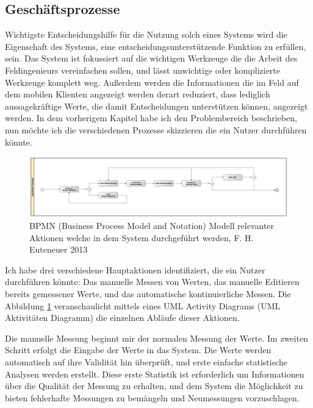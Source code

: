 \subsection{Geschäftsprozesse}
Wichtigste Entscheidungshilfe für die Nutzung solch eines Systems wird die Eigenschaft des Systems, eine entscheidungsunterstützende Funktion zu erfüllen, sein. Das System ist fokussiert auf die wichtigen Werkzeuge die die Arbeit des Feldingenieurs vereinfachen sollen, und lässt unwichtige oder komplizierte Werkzeuge komplett weg. Außerdem werden die Informationen die im Feld auf dem mobilen Klienten angezeigt werden derart reduziert, dass lediglich aussagekräftige Werte, die damit Entscheidungen unterstützen können, angezeigt werden. In dem vorherigem Kapitel habe ich den Problembereich beschrieben, nun möchte ich die verschiedenen Prozesse skizzieren die ein Nutzer durchführen könnte.

\begin{figure}[H]
	\centering
 	 \includegraphics[scale=0.2]{graphics/bpmn_business-processes.jpg} 
	\caption{BPMN (Business Process Model and Notation) Modell relevanter Aktionen welche in dem System durchgeführt werden, F. H. Euteneuer 2013}
	 \label{fig:model_business-processes}
\end{figure}

Ich habe drei verschiedene Hauptaktionen identifiziert, die ein Nutzer durchführen könnte: Das manuelle Messen von Werten, das manuelle Editieren bereits gemessener Werte, und das automatische kontinuierliche Messen. Die Abbildung \ref{fig:model_business-processes} veranschaulicht mittels eines \gls{UML} Activity Diagrams (\gls{UML} Aktivitäten Diagramm) die einzelnen Abläufe dieser Aktionen.

Die manuelle Messung beginnt mir der normalen Messung der Werte. Im zweiten Schritt erfolgt die Eingabe der Werte in das System. Die Werte werden automatisch auf ihre Validität hin überprüft, und erste einfache statistische Analysen werden erstellt. Diese erste Statistik ist erforderlich um Informationen über die Qualität der Messung zu erhalten, und dem System die Möglichkeit zu bieten fehlerhafte Messungen zu bemängeln und Neumessungen vorzuschlagen.

